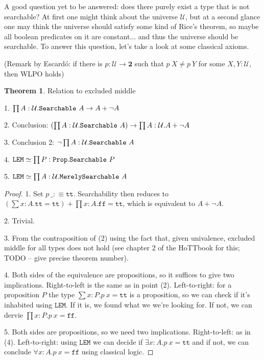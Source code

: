 \documentclass[11pt]{article}
\theoremstyle{definition}
\newtheorem{theorem}{Theorem}[section]
\newcommand{\txt}[1]{\texttt{#1}}
\newcommand{\text}[1]{\texttt{#1}}
\renewcommand{\(}{\left(}
\renewcommand{\)}{\right)}
\newcommand{\defn}{:\equiv}
\newcommand{\U}{\mathcal{U}}
\newcommand{\Prop}{\text{Prop}}
\newcommand{\apl}[2]{#1\ #2}
\newcommand{\hequiv}[2]{#1 \simeq #2}
\newcommand{\Bool}{\mathbf{2}}
\newcommand{\true}{\txt{tt}}
\newcommand{\false}{\txt{ff}}
\newcommand{\dprod}[2]{\prod #1.#2}
\newcommand{\dsum}[2]{\sum #1.#2}
\newcommand{\all}[2]{\forall #1.#2}
\newcommand{\ex}[2]{\exists #1.#2}
\begin{document}
A good question yet to be answered: does there purely exist a type that is not searchable? At first one might think about the universe $\U$, but at a second glance one may think the universe should satisfy some kind of Rice's theorem, so maybe all boolean predicates on it are constant... and thus the universe should be searchable. To answer this question, let's take a look at some classical axioms.

(Remark by Escard\'{o}: if there is $p : \U \to \Bool$ such that $\apl{p}{X} \neq \apl{p}{Y}$ for some $X, Y : \U$, then WLPO holds)

\newcommand{\LEM}{\txt{LEM}}
\begin{theorem} Relation to excluded middle

1. $\dprod{A : \U}{\apl{\Searchable}{A} \to A + \neg A}$

2. Conclusion: $\(\dprod{A : \U}{\apl{\Searchable}{A}}\) \to \dprod{A : \U}{A + \neg A}$

3. Conclusion 2: $\neg \dprod{A : \U}{\apl{\Searchable}{A}}$

4. $\hequiv{\LEM}{\dprod{P : \Prop}{\apl{\Searchable}{P}}}$

5. $\hequiv{\LEM}{\dprod{A : \U}{\apl{\MerelySearchable}{A}}}$
\end{theorem}
\begin{proof}

1. Set $\apl{p}{\_} \defn \true$. Searchability then reduces to $\(\dsum{x : A}{\true = \true}\) + \dprod{x : A}{\false = \true}$, which is equivalent to $A + \neg A$.

2. Trivial.

3. From the contraposition of (2) using the fact that, given univalence, excluded middle for all types does not hold (see chapter 2 of the HoTTbook for this; TODO -- give precise theorem number).

4. Both sides of the equivalence are propositions, so it suffices to give two implications. Right-to-left is the same as in point (2). Left-to-right: for a proposition $P$ the type $\dsum{x : P}{\apl{p}{x} = \true}$ is a proposition, so we can check if it's inhabited using $\LEM$. If it is, we found what we we're looking for. If not, we can dervie $\dprod{x : P}{\apl{p}{x} = \false}$.

5. Both sides are propositions, so we need two implications. Right-to-left: as in (4). Left-to-right: using $\LEM$ we can decide if $\ex{x : A}{\apl{p}{x} = \true}$ and if not, we can conclude $\all{x : A}{\apl{p}{x} = \false}$ using classical logic.
\end{proof}
\end{document}
